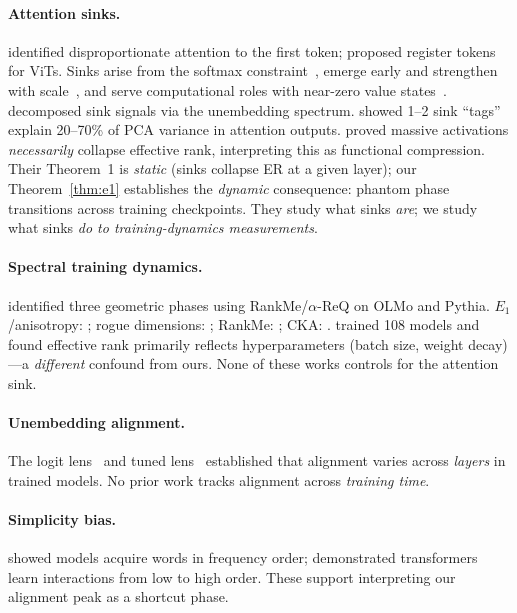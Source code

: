 \documentclass[11pt]{article}
\begin{document}
\paragraph{Attention sinks.}
\citet{xiao2024efficient} identified disproportionate attention to the first token; \citet{darcet2024vision} proposed register tokens for ViTs.
Sinks arise from the softmax constraint~\citep{sun2024massive}, emerge early and strengthen with scale~\citep{gu2025attention}, and serve computational roles with near-zero value states~\citep{barbero2025why}.
\citet{cancedda2024spectral} decomposed sink signals via the unembedding spectrum.
\citet{zhang2025catch} showed 1--2 sink ``tags'' explain 20--70\% of PCA variance in attention outputs.
\citet{queipodellano2025sinks} proved massive activations \emph{necessarily} collapse effective rank, interpreting this as functional compression.
Their Theorem~1 is \emph{static} (sinks collapse ER at a given layer); our Theorem~\ref{thm:e1} establishes the \emph{dynamic} consequence: phantom phase transitions across training checkpoints.
They study what sinks \emph{are}; we study what sinks \emph{do to training-dynamics measurements}.

\paragraph{Spectral training dynamics.}
\citet{li2025tracing} identified three geometric phases using RankMe/$\alpha$-ReQ on OLMo and Pythia.
$E_1$/anisotropy: \citet{ethayarajh2019contextual}; rogue dimensions: \citet{timkey2021all}; RankMe: \citet{garrido2023rankme}; CKA: \citet{kornblith2019similarity}.
\citet{kulkarni2026disentangling} trained 108 models and found effective rank primarily reflects hyperparameters (batch size, weight decay)---a \emph{different} confound from ours.
None of these works controls for the attention sink.

\paragraph{Unembedding alignment.}
The logit lens~\citep{nostalgebraist2020logit} and tuned lens~\citep{belrose2023eliciting} established that alignment varies across \emph{layers} in trained models.
No prior work tracks alignment across \emph{training time}.

\paragraph{Simplicity bias.}
\citet{chang2022word} showed models acquire words in frequency order; \citet{cagnetta2024distributional} demonstrated transformers learn interactions from low to high order.
These support interpreting our alignment peak as a shortcut phase.
\end{document}
